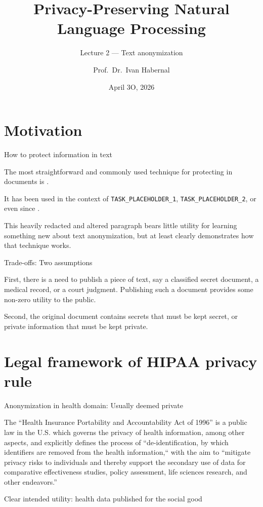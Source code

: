 \documentclass[12pt,aspectratio=169,handout]{beamer}
\title{Privacy-Preserving Natural Language Processing}
\subtitle{Lecture 2 --- Text anonymization}
\date{April 3O, 2026}
\author{Prof.\ Dr.\ Ivan Habernal}
\institute{
\texttt{www.trusthlt.org} \\
Trustworthy Human Language Technologies Group (TrustHLT) \\
Ruhr University Bochum \& Research Center Trustworthy Data Science and Security}
\begin{document}
\maketitle

\section{Motivation}

\begin{frame}{How to protect information in text}


The most straightforward and commonly used technique for protecting  in documents is .

\pause

It has been used in the context of \texttt{TASK\_PLACEHOLDER\_1}, \texttt{TASK\_PLACEHOLDER\_2}, or even  since .

\pause

This heavily redacted and altered paragraph bears little utility for learning something new about text anonymization, but at least clearly demonstrates how that technique works.
\end{frame}

\begin{frame}{Trade-offs: Two assumptions}

First, there is a need to publish a piece of text, say a classified secret document, a medical record, or a court judgment. Publishing such a document provides some non-zero utility to the public.

Second, the original document contains secrets that must be kept secret, or private information that must be kept private.
\end{frame}


\section{Legal framework of HIPAA privacy rule} 

\begin{frame}{Anonymization in health domain: Usually deemed private}

The ``Health Insurance Portability and Accountability Act of 1996'' is a public law in the U.S. which governs the privacy of health information, among other aspects, and explicitly defines the process of ``de-identification, by which identifiers are removed from the health information,`` with the aim to ``mitigate privacy risks to individuals and thereby support the secondary use of data for comparative effectiveness studies, policy assessment, life sciences research, and other endeavors.''

Clear intended utility: health data published for the social good
\end{frame}
\end{document}

